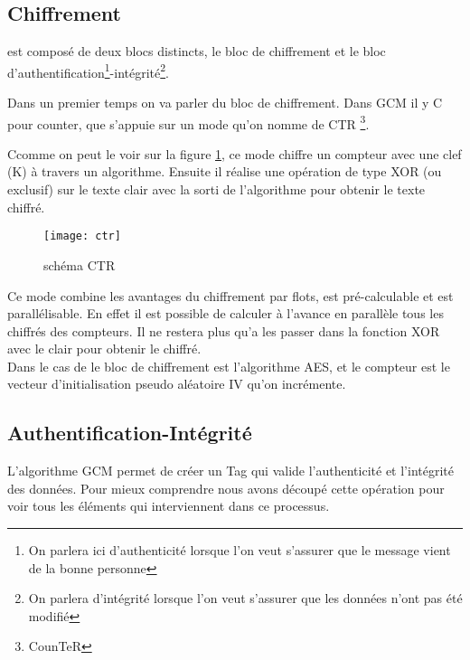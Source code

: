 \subsection{Chiffrement}

\aes est composé de deux blocs distincts, le bloc de chiffrement et le bloc d'authentification\footnote{On parlera ici d'authenticité lorsque l'on veut s'assurer que le message vient de la bonne personne}-intégrité\footnote{On parlera d'intégrité lorsque l'on veut s'assurer que les données n'ont pas été modifié}.

Dans un premier temps on va parler du bloc de chiffrement. Dans GCM il y C pour \og counter\fg{}, \cad que \aes s'appuie sur un mode qu'on nomme de CTR \footnote{CounTeR}.

Ccomme on peut le voir sur la figure \ref{schema CTR}, ce mode chiffre un compteur avec une clef (K) à travers un algorithme. Ensuite il réalise une opération de type XOR (ou exclusif) sur le texte clair avec la sorti de l'algorithme pour obtenir le texte chiffré.

\begin{figure}[!h]
  \centering
  \texttt{[image: ctr]}
  \caption{schéma CTR \cite{wiki}}
  \label{schema CTR}
\end{figure}

 Ce mode combine les avantages du chiffrement par flots, est pré-calculable et est parallélisable. En effet il est possible de calculer à l'avance en parallèle tous les chiffrés des compteurs. Il ne restera plus qu'a les passer dans la fonction XOR avec le clair pour obtenir le chiffré.
 ~\\

 Dans le cas de \aes le bloc de chiffrement est l'algorithme AES, et le compteur est le vecteur d'initialisation pseudo aléatoire IV qu'on incrémente.


\subsection{Authentification-Intégrité}

L'algorithme GCM permet de créer un Tag qui valide l'authenticité et l'intégrité des données. Pour mieux comprendre nous avons découpé cette opération pour voir tous les éléments qui interviennent dans ce processus.


